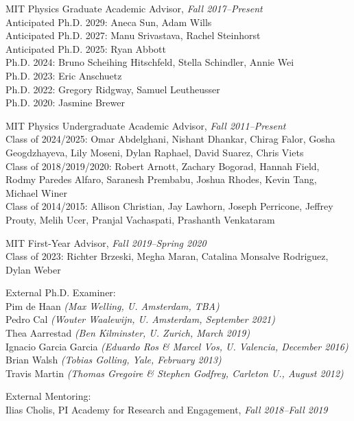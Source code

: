 \item MIT Physics Graduate Academic Advisor, \emph{Fall 2017--Present}
\\ Anticipated Ph.D. 2029: Aneca Sun, Adam Wills
\\ Anticipated Ph.D. 2027: Manu Srivastava, Rachel Steinhorst
\\ Anticipated Ph.D. 2025: Ryan Abbott
\\ Ph.D. 2024: Bruno Scheihing Hitschfeld, Stella Schindler, Annie Wei
\\ Ph.D. 2023: Eric Anschuetz
\\ Ph.D. 2022: Gregory Ridgway, Samuel Leutheusser
\\ Ph.D. 2020: Jasmine Brewer
\item MIT Physics Undergraduate Academic Advisor, \emph{Fall 2011--Present}
\\ Class of 2024/2025: Omar Abdelghani, Nishant Dhankar, Chirag Falor, Gosha Geogdzhayeva, Lily Moseni, Dylan Raphael, David Suarez, Chris Viets
\\ Class of 2018/2019/2020: Robert Arnott, Zachary Bogorad, Hannah Field, Rodmy Paredes Alfaro, Saranesh Prembabu, Joshua Rhodes, Kevin Tang, Michael Winer
\\ Class of 2014/2015: Allison Christian, Jay Lawhorn, Joseph Perricone, Jeffrey Prouty, Melih Ucer, Pranjal Vachaspati, Prashanth Venkataram
\item MIT First-Year Advisor, \emph{Fall 2019--Spring 2020}
\\ Class of 2023: Richter Brzeski, Megha Maran, Catalina Monsalve Rodriguez, Dylan Weber

\item External Ph.D. Examiner:
\\ Pim de Haan \textit{(Max Welling, U. Amsterdam, TBA)}
\\ Pedro Cal \textit{(Wouter Waalewijn, U. Amsterdam, September 2021)}
\\ Thea Aarrestad \textit{(Ben Kilminster, U. Zurich, March 2019)}
\\ Ignacio Garcia Garcia \textit{(Eduardo Ros \& Marcel Vos, U. Valencia, December 2016)}
\\ Brian Walsh \textit{(Tobias Golling, Yale, February 2013)}
\\ Travis Martin \textit{(Thomas Gregoire \& Stephen Godfrey, Carleton U., August 2012)}

\item External Mentoring:
\\ Ilias Cholis, PI Academy for Research and Engagement, \emph{Fall 2018--Fall 2019}

\el
